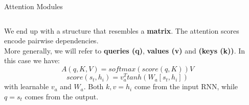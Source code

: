 \documentclass[9pt]{beamer}
\begin{document}
\begin{frame}{Attention Modules}
\begin{columns}[onlytextwidth]
    \begin{column}{0.50\textwidth}
    We end up with a structure that resembles a \textbf{matrix}. The attention scores encode pairwise dependencies.\\
     {More generally, we will refer to \textbf{queries (q)}, \textbf{values (v)} and \textbf{(keys (k))}. In this case we have:
    $$ A(q,K,V) = softmax(score(q,K))V$$
    $$score(s_t,h_i) = v_a^Ttanh(W_a[s_t,h_i])$$
    with learnable $v_a$ and $W_a$. Both $k,v=h_i$ come from the input RNN, while $q=s_t$ comes from the output. }
    \end{column}
    \begin{column}{0.50\textwidth}
        \centering
{}
\end{column}
\end{columns}
\end{frame}
\end{document}
